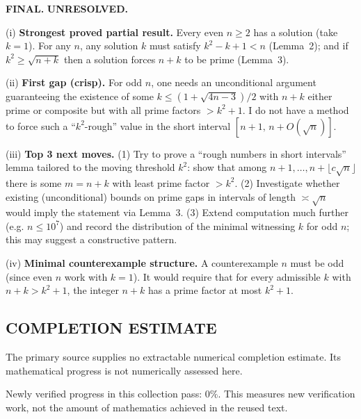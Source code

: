 \textbf{FINAL.}
\textbf{UNRESOLVED.}

(i) \textbf{Strongest proved partial result.}
Every even $n\ge2$ has a solution (take $k=1$). For any $n$, any solution $k$ must satisfy $k^{2}-k+1<n$ (Lemma~2); and if $k^{2}\ge\sqrt{n+k}$ then a solution forces $n+k$ to be prime (Lemma~3).

(ii) \textbf{First gap (crisp).}
For odd $n$, one needs an unconditional argument guaranteeing the existence of some $k\le (1+\sqrt{4n-3})/2$ with $n+k$ either prime or composite but with all prime factors $>k^{2}+1$. I do not have a method to force such a ``$k^{2}$-rough'' value in the short interval $[n+1,\,n+O(\sqrt n)]$.

(iii) \textbf{Top 3 next moves.}
(1) Try to prove a ``rough numbers in short intervals'' lemma tailored to the moving threshold $k^{2}$: show that among $n+1,\dots,n+\lfloor c\sqrt n\rfloor$ there is some $m=n+k$ with least prime factor $>k^{2}$.
(2) Investigate whether existing (unconditional) bounds on prime gaps in intervals of length $\asymp \sqrt n$ would imply the statement via Lemma~3.
(3) Extend computation much further (e.g. $n\le 10^{7}$) and record the distribution of the minimal witnessing $k$ for odd $n$; this may suggest a constructive pattern.

(iv) \textbf{Minimal counterexample structure.}
A counterexample $n$ must be odd (since even $n$ work with $k=1$). It would require that for every admissible $k$ with $n+k>k^{2}+1$, the integer $n+k$ has a prime factor at most $k^{2}+1$.




\subsection*{COMPLETION ESTIMATE}
The primary source supplies no extractable numerical completion estimate. Its mathematical progress is not numerically assessed here.

Newly verified progress in this collection pass: $0\%$. This measures new verification work, not the amount of mathematics achieved in the reused text.
